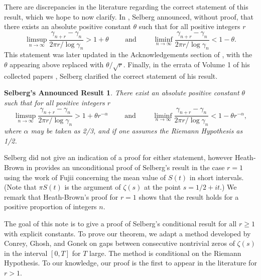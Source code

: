 \documentclass[oneside]{amsart}
\newtheorem*{Selberg2*}{Selberg's Announced Result}
\begin{document}
There are discrepancies in the literature regarding the correct statement of this result, which we hope to now clarify. In \cite[p. 199]{Sel47}, Selberg announced, without proof, that there exists an absolute positive constant $\theta$ such that for all positive integers $r$
\[
\limsup_{n\to \infty}\frac{\gamma_{n+r}-\gamma_n}{2\pi r / \log \gamma_n} > 1+ \theta \qquad \text{ and } \qquad \liminf_{n\to \infty}\frac{\gamma_{n+r}-\gamma_n}{2\pi r/ \log \gamma_n} < 1- \theta . 
\]
This statement was later updated in the Acknowledgements section of \cite{Mue82}, with the $\theta$ appearing above replaced with $\theta/\sqrt{r}$. Finally, in the errata of Volume 1 of his collected papers \cite[p. 355]{SelCollected}, Selberg clarified the correct statement of his result.
\begin{Selberg2*}
There exist an absolute positive constant $\theta$ such that for all positive integers $r$
\[
\limsup_{n\to \infty}\frac{\gamma_{n+r}-\gamma_n}{2\pi r / \log \gamma_n} > 1+ \theta r^{-\alpha}\qquad \text{ and } \qquad \liminf_{n\to \infty}\frac{\gamma_{n+r}-\gamma_n}{2\pi r / \log \gamma_n} < 1- \theta  r^{-\alpha}, 
\]
where $\alpha$ may be taken as 2/3, and if one assumes the Riemann Hypothesis as 1/2.
\end{Selberg2*}
Selberg did not give an indication of a proof for either statement, however Heath-Brown in \cite[p. 246-249]{Titchmarsh} provides an unconditional proof of Selberg's result in the case $r=1$ using the work of Fujii \cite{Fujii1} concerning the mean value of $S(t)$ in short intervals. (Note that $\pi S(t)$ is the argument of $\zeta(s)$ at the point $s = 1/2 + it.$) We remark that Heath-Brown's proof for $r=1$ shows that the result holds for a positive proportion of integers $n$. 

The goal of this note is to give a proof of Selberg's conditional result for all $r\ge1$ with explicit constants. To prove our theorem, we adapt a method developed by Conrey, Ghosh, and Gonek \cite{CGG84} on gaps between consecutive nontrivial zeros of $\zeta(s)$ in the interval $[0,T]$ for $T$ large. The method is conditional on the Riemann Hypothesis. To our knowledge, our proof is the first to appear in the literature for $r>1$.
\end{document}
